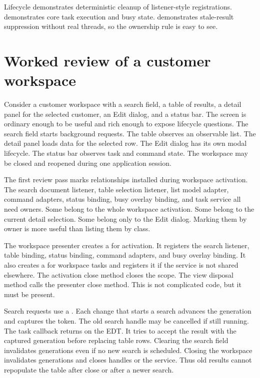 \begin{examplebox}{Lifecycle}
\lifecycleExample{} demonstrates deterministic cleanup of listener-style
registrations. \asyncTaskExample{} demonstrates core task execution and busy
state. \generationCounterExample{} demonstrates stale-result suppression
without real threads, so the ownership rule is easy to see.
\end{examplebox}

\section{Worked review of a customer workspace}

Consider a customer workspace with a search field, a table of results, a detail
panel for the selected customer, an Edit dialog, and a status bar. The screen
is ordinary enough to be useful and rich enough to expose lifecycle questions.
The search field starts background requests. The table observes an observable
list. The detail panel loads data for the selected row. The Edit dialog has its
own modal lifecycle. The status bar observes task and command state. The
workspace may be closed and reopened during one application session.

The first review pass marks relationships installed during workspace
activation. The search document listener, table selection listener, list
model adapter, command adapters, status binding, busy overlay binding, and
task service all need owners. Some belong to the whole workspace activation.
Some belong to the current detail selection. Some belong only to the Edit
dialog. Marking them by owner is more useful than listing them by class.

The workspace presenter creates a  for activation. It
registers the search listener, table binding, status binding, command
adapters, and busy overlay binding. It also creates a  for
workspace tasks and registers it if the service is not shared elsewhere. The
activation close method closes the scope. The view disposal method calls the
presenter close method. This is not complicated code, but it must be present.

Search requests use a . Each change that starts a
search advances the generation and captures the token. The old search handle
may be cancelled if still running. The task callback returns on the EDT. It
tries to accept the result with the captured generation before replacing table
rows. Clearing the search field invalidates generations even if no new search
is scheduled. Closing the workspace invalidates generations and closes handles
or the service. Thus old results cannot repopulate the table after close or
after a newer search.

